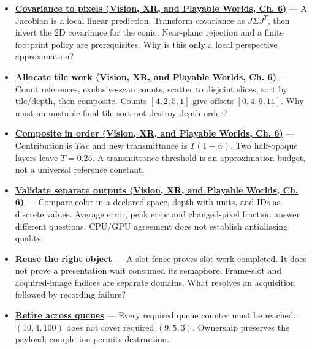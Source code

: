 \begin{itemize}
\item
  \textbf{\href{../07-Vision-XR-and-Playable-Worlds/main.pdf\#nameddest=04-visual-computing-ii-ch037-local-projection-turns-an-ellipsoid-into-a-screen-ellipse}{Covariance to pixels (Vision, XR, and Playable Worlds, Ch. 6)}} --- A Jacobian is a local linear prediction. Transform covariance as \(J\Sigma J^T\), then invert the 2D covariance for the conic. Near-plane rejection and a finite footprint policy are prerequisites. Why is this only a local perspective approximation?
\item
  \textbf{\href{../07-Vision-XR-and-Playable-Worlds/main.pdf\#nameddest=04-visual-computing-ii-ch037-from-ellipses-to-bounded-tile-work}{Allocate tile work (Vision, XR, and Playable Worlds, Ch. 6)}} --- Count references, exclusive-scan counts, scatter to disjoint slices, sort by tile/depth, then composite. Counts \([4,2,5,1]\) give offsets \([0,4,6,11]\). Why must an unstable final tile sort not destroy depth order?
\item
  \textbf{\href{../07-Vision-XR-and-Playable-Worlds/main.pdf\#nameddest=04-visual-computing-ii-ch037-figure-er1---footprint-compositing-order-and-storage-lifetime}{Composite in order (Vision, XR, and Playable Worlds, Ch. 6)}} --- Contribution is \(T\alpha c\) and new transmittance is \(T(1-\alpha)\). Two half-opaque layers leave \(T=0.25\). A transmittance threshold is an approximation budget, not a universal reference constant.
\item
  \textbf{\href{../07-Vision-XR-and-Playable-Worlds/main.pdf\#nameddest=04-visual-computing-ii-ch037-validation-should-isolate-representations-before-images}{Validate separate outputs (Vision, XR, and Playable Worlds, Ch. 6)}} --- Compare color in a declared space, depth with units, and IDs as discrete values. Average error, peak error and changed-pixel fraction answer different questions. CPU/GPU agreement does not establish antialiasing quality.
\item
  \textbf{\hyperref[01-foundations-i-ch011-follow-a-frame-slot-and-a-presentation-image-separately]{Reuse the right object}} --- A slot fence proves slot work completed. It does not prove a presentation wait consumed its semaphore. Frame-slot and acquired-image indices are separate domains. What resolves an acquisition followed by recording failure?
\item
  \textbf{\hyperref[01-foundations-i-ch011-retire-a-resource-after-every-user-not-after-one-convenient-clock]{Retire across queues}} --- Every required queue counter must be reached. \((10,4,100)\) does not cover required \((9,5,3)\). Ownership preserves the payload; completion permits destruction.

\end{itemize}
